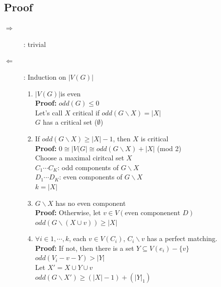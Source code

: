         \subsection{Proof}
            \begin{description}
                \item[$\Rightarrow$]: trivial
                \item[$\Leftarrow$]: Induction on $|V(G)|$\\
                    \begin{enumerate}
                        \item $|V(G)|$is even\\
                            \textbf{Proof:} $odd(G)\leq 0$\\
                            Let's call $X$ critical if $odd(G\backslash X)=|X|$\\
                            $G$ has a critical set ($\emptyset$)
                        \item If $odd(G\backslash X)\geq |X|-1$, then $X$ is critical\\
                            \textbf{Proof:} $0\cong |V(G| \cong odd(G\backslash X)+|X|$ (mod 2)\\
                            Choose a maximal ciritcal set $X$\\
                            $C_1\cdots C_K$: odd components of $G\backslash X$\\
                            $D_1\cdots D_K$: even components of $G\backslash X$\\
                            $k=|X|$
                        \item $G\backslash X$ has no even component\\
                            \textbf{Proof:} Otherwise, let $v\in V(\text{even componenent }D)$\\
                            $odd(G\backslash (X\cup{v}))\geq|X|$
                        \item $\forall i \in 1, \cdots, k$, each $v\in V(C_i)$, $C_i\backslash v$ has a perfect matching.\\
                            \textbf{Proof:} If not, then there is a set $Y\subseteq V(e_i)-\{v\}$\\
                            $odd(V_i-{v}-Y)>|Y|$\\
                            Let $X'=X\cup Y\cup{v}$\\
                            $odd(G\backslash X')\geq(|X|-1)+(|Y|_1)$
                    \end{enumerate}%
            \end{description}
